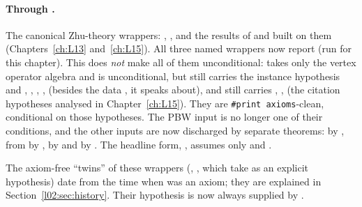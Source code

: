 \paragraph{Through .} The canonical Zhu-theory wrappers:
\allowbreak{}, \allowbreak{}\allowbreak{}\allowbreak{}\allowbreak{},
\allowbreak{}\allowbreak{}\allowbreak{} and the results of 
and  built on them (Chapters~\ref{ch:L13}
and~\ref{ch:L15}). All three named wrappers now report  (run
for this chapter). This does \emph{not} make all of them unconditional: \allowbreak{}
takes only the vertex operator algebra  and is unconditional, but
\allowbreak{}\allowbreak{}\allowbreak{}\allowbreak{} still carries
the instance hypothesis \lean{[Finite (Φ W)]} and , , , ,
 (besides the data ,  it speaks about), and
\allowbreak{}\allowbreak{}\allowbreak{} still carries , , 
(the citation hypotheses analysed in Chapter~\ref{ch:L15}). They are \texttt{\#print axioms}-clean,
conditional on those hypotheses. The PBW input is no longer one of their conditions, and the other inputs
are now discharged by separate theorems: \lean{[Finite (Φ W)]} by , 
from  by \allowbreak{}\allowbreak{},
 by  and  by
. The headline form, \allowbreak{}\allowbreak{}\allowbreak{}, assumes only
 and .

The axiom-free ``twins'' of these wrappers (, \allowbreak{}\allowbreak{}\allowbreak{},
which take  as an explicit hypothesis) date from the time when  was an axiom; they
are explained in Section~\ref{l02:sec:history}. Their  hypothesis is now always supplied by
\allowbreak{}.

